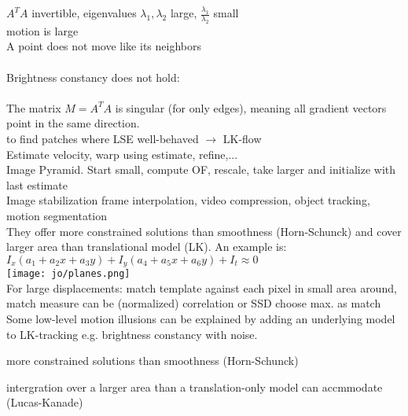  $A^TA$ invertible, eigenvalues $\lambda_1, \lambda_2$ large, $\frac{\lambda_1}{\lambda_2}$ small\\
 motion is large \\
A point does not move like its neighbors \\
\\
Brightness constancy does not hold:\\
 \\
The matrix $M = A^TA$ is singular (for only edges), meaning all gradient vectors point in the same direction.\\
 to find patches where LSE well-behaved $\rightarrow$ LK-flow\\
 Estimate velocity, warp using estimate, refine,...\\
 Image Pyramid. Start small, compute OF, rescale, take larger and initialize with last estimate\\
 Image stabilization  frame interpolation, video compression, object tracking, motion segmentation\\
They offer more constrained solutions than smoothness (Horn-Schunck) and cover larger area than translational model (LK). An example is: \\
 $I_x(a_1 + a_2x + a_3y) + I_y(a_4 + a_5x + a_6y) + I_t \approx 0$ \\ \texttt{[image: jo/planes.png]}\\
 For large displacements: match template against each pixel in small area around, match measure can be (normalized) correlation or SSD choose max. as match \\
 Some low-level motion illusions can be explained by adding an underlying model to LK-tracking e.g. brightness constancy with noise.
\begin{compactitem}
    \item more constrained solutions than smoothness (Horn-Schunck)
    \item intergration over a larger area than a translation-only model can accmmodate (Lucas-Kanade)
\end{compactitem}
